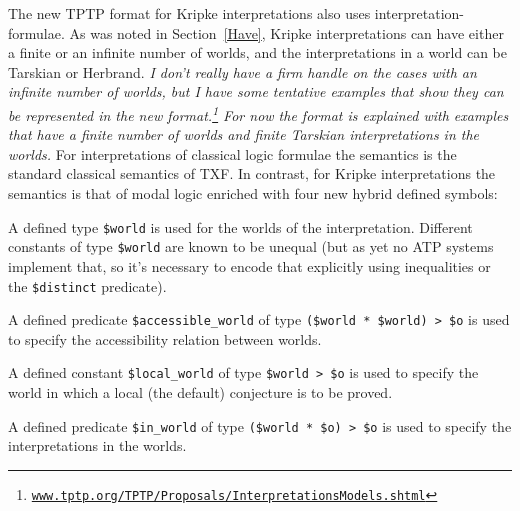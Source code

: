 \documentclass{easychair}
\newenvironment{packed_itemize}{
\vspace*{-0.3em}
\begin{itemize}
\setlength{\partopsep}{0pt}
\setlength{\itemsep}{1pt}
\setlength{\parskip}{0pt}
\setlength{\parsep}{0pt}
}{\end{itemize}}
\begin{document}
The new TPTP format for Kripke interpretations also uses interpretation-formulae.
As was noted in Section~\ref{Have}, Kripke interpretations can have either a finite or an
infinite number of worlds, and the interpretations in a world can be Tarskian or Herbrand.
\emph{I don't really have a firm handle on the cases with an infinite number of worlds, but I 
have some tentative examples that show they can be represented in the new format.\footnote{%
\href{https://www.tptp.org/TPTP/Proposals/InterpretationsModels.shtml\#KripkeInfiniteFinite}{{\tt www.tptp.org/TPTP/Proposals/InterpretationsModels.shtml}}}
For now the format is explained with examples that have a finite number of worlds and finite
Tarskian interpretations in the worlds.}
For interpretations of classical logic formulae the semantics is the standard classical semantics 
of TXF.
In contrast, for Kripke interpretations the semantics is that of modal logic enriched with four 
new hybrid defined symbols:
\begin{packed_itemize}
\item A defined type {\tt \$world} is used for the worlds of the interpretation.
      Different constants of type {\tt \$world} are known to be unequal (but as yet no ATP 
      systems implement that, so it's necessary to encode that explicitly using inequalities or 
      the {\tt \$distinct} predicate).
\item A defined predicate {\tt \$accessible\_world} of type {\tt (\$world\,*\,\$world)\,>\,\$o}
      is used to specify the accessibility relation between worlds.
\item A defined constant {\tt \$local\_world} of type {\tt \$world\,>\,\$o} is used to specify 
      the world in which a local (the default) conjecture is to be proved. 
\item A defined predicate {\tt \$in\_world} of type {\tt (\$world\,*\,\$o)\,>\,\$o} is used to 
      specify the interpretations in the worlds.
\end{packed_itemize}
\end{document}
